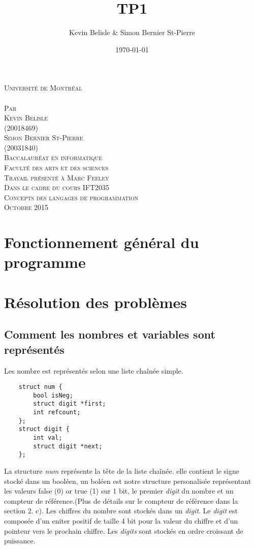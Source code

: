\documentclass[a4paper,12pt,french]{article}
\date{\today}
\author{Kevin Belisle \& Simon Bernier St-Pierre}
\title{TP1}
\newcommand{\Teacher}{Marc Feeley}
\newcommand{\ClassNum}{IFT2035}
\newcommand{\ClassName}{Concepts des langages de programmation}
\newcommand{\DateMMMMYYYY}{Octobre 2015}
\newcommand{\Author}{Kevin Belisle}
\newcommand{\Authorr}{Simon Bernier St-Pierre}
\begin{document}
\begin{titlepage}
	\begin{center}
		\textsc{\normalsize Université de Montréal}\\[2.5cm]

		\textsc{\LARGE \@title}\\[2.5cm]

		\textsc{\small Par}\\[0.25cm]
		\textsc{\LARGE \Author}\\[0.25cm]
		\textsc{\normalsize (20018469)}\\[0.25cm]
		\textsc{\LARGE \Authorr}\\[0.25cm]
		\textsc{\normalsize (20031840)}\\[2.5cm]

		\textsc{\normalsize Baccalauréat en informatique}\\
		\textsc{\normalsize Faculté des arts et des sciences}\\[2.5cm]

		\textsc{\small Travail présenté à \Teacher}\\
		\textsc{\small Dans le cadre du cours \ClassNum}\\
		\textsc{\small \ClassName}\\[2.5cm]

		\textsc{\normalsize \DateMMMMYYYY}\\[1.5cm]
	\end{center}
\end{titlepage}
\section{Fonctionnement général du programme}

\section{Résolution des problèmes}
	\renewcommand{\thesubsection}{(\alph{subsection})}

	\subsection{Comment les nombres et variables sont représentés}
		Les nombre est représentés selon une liste chaînée simple.
\begin{lstlisting}
	struct num {
	    bool isNeg;
	    struct digit *first;
	    int refcount;
	};
	struct digit {
	    int val;
	    struct digit *next;
	};
\end{lstlisting}
		La structure \textit{num} représente la tête de la liste chaînée. elle contient le signe stocké dans un booléen, un boléen est notre structure personalisée représentant les valeurs \og false \fg{}(0) or \og true \fg{}(1) sur 1 bit, le premier \textit{digit} du nombre et un compteur de référence.(Plus de détails sur le compteur de référence dans la section 2. c). Les chiffres du nombre sont stockés dans un \textit{digit}. Le \textit{digit} est composée d'un eniter positif de taille 4 bit pour la valeur du chiffre et d'un pointeur vers le prochain chiffre. Les \textit{digits} sont stockés en ordre croissant de puissance.\\
\end{document}
